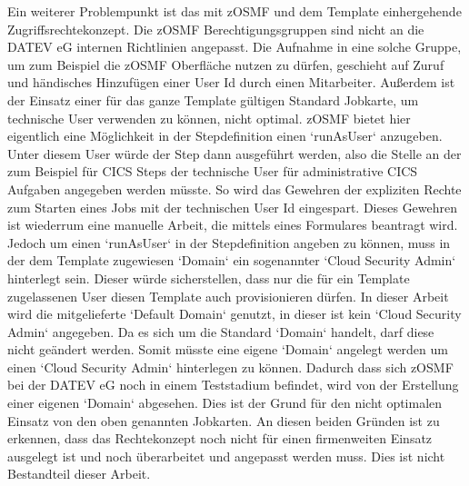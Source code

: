 Ein weiterer Problempunkt ist das mit zOSMF und dem Template einhergehende Zugriffsrechtekonzept.
Die zOSMF Berechtigungsgruppen sind nicht an die DATEV eG internen Richtlinien angepasst.
Die Aufnahme in eine solche Gruppe, um zum Beispiel die zOSMF Oberfläche nutzen zu dürfen, geschieht auf Zuruf und händisches Hinzufügen einer User Id durch einen Mitarbeiter.
Außerdem ist der Einsatz einer für das ganze Template gültigen Standard Jobkarte, um technische User verwenden zu können, nicht optimal.
zOSMF bietet hier eigentlich eine Möglichkeit in der Stepdefinition einen `runAsUser` anzugeben.
Unter diesem User würde der Step dann ausgeführt werden, also die Stelle an der zum Beispiel für CICS Steps der technische User für administrative CICS Aufgaben angegeben werden müsste.
So wird das Gewehren der expliziten Rechte zum Starten eines Jobs mit der technischen User Id eingespart.
Dieses Gewehren ist wiederrum eine manuelle Arbeit, die mittels eines Formulares beantragt wird.
Jedoch um einen `runAsUser` in der Stepdefinition angeben zu können, muss in der dem Template zugewiesen `Domain` ein sogenannter `Cloud Security Admin` hinterlegt sein.
Dieser würde sicherstellen, dass nur die für ein Template zugelassenen User diesen Template auch provisionieren dürfen.
In dieser Arbeit wird die mitgelieferte `Default Domain` genutzt, in dieser ist kein `Cloud Security Admin` angegeben.
Da es sich um die Standard `Domain` handelt, darf diese nicht geändert werden.
Somit müsste eine eigene `Domain` angelegt werden um einen `Cloud Security Admin` hinterlegen zu können.
Dadurch dass sich zOSMF bei der DATEV eG noch in einem Teststadium befindet, wird von der Erstellung einer eigenen `Domain` abgesehen.
Dies ist der Grund für den nicht optimalen Einsatz von den oben genannten Jobkarten.
An diesen beiden Gründen ist zu erkennen, dass das Rechtekonzept noch nicht für einen firmenweiten Einsatz ausgelegt ist und noch überarbeitet und angepasst werden muss.
Dies ist nicht Bestandteil dieser Arbeit.

